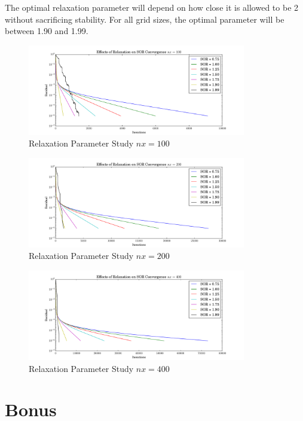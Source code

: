 \documentclass[letterpaper,12pt,]{article}
\begin{document}
The optimal relaxation parameter will depend on how close it is allowed to be 2 without sacrificing stability. For all grid sizes, the optimal parameter will be between 1.90 and 1.99.

\begin{figure}[!h]
    \centering
    \includegraphics[width = 0.85\textwidth]{./Figures/SOR100.pdf}
    \caption{Relaxation Parameter Study $nx = 100$}
    \label{fig:sor100}
\end{figure}

\begin{figure}[!h]
    \centering
    \includegraphics[width = 0.85\textwidth]{./Figures/SOR200.pdf}
    \caption{Relaxation Parameter Study $nx = 200$}
    \label{fig:sor200}
\end{figure}
\begin{figure}[!h]
    \centering
    \includegraphics[width = 0.85\textwidth]{./Figures/SOR400.pdf}
    \caption{Relaxation Parameter Study $nx = 400$}
    \label{fig:sor400}
\end{figure}
\section*{Bonus}
\end{document}

